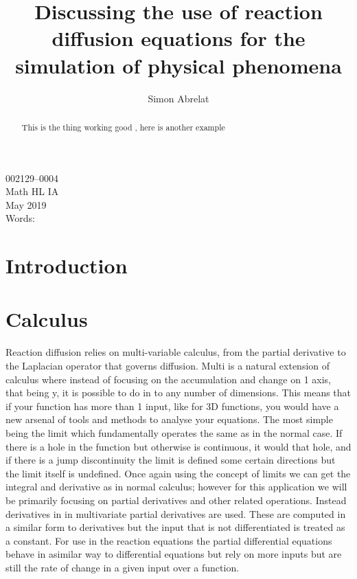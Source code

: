 \documentclass[12pt, letterpaper]{article}
\title{Discussing the use of reaction diffusion equations for the simulation of physical phenomena}
\author{Simon Abrelat}
\date{\vspace{-5ex}}
\begin{document}
\large
{\fontsize{12}{14.4}
  {\singlespace{}
  \maketitle
  \begin{center}
  \vspace{4mm}
  002129--0004 \\
  \vspace{4mm}
  Math HL IA \\
  \vspace{4mm}
  May 2019 \\
  \vspace{4mm}
  Words: \\
  \end{center}
  }
}
\newpage

\begin{abstract}
  This is the thing working good \citep{turing}, here is another example \citep*{grayscott}
\end{abstract}

\newpage
\tableofcontents
\newpage 

\section{Introduction}

\section{Calculus}
Reaction diffusion relies on multi-variable calculus, from the partial derivative to the Laplacian 
operator that governs diffusion. Multi is a natural extension of calculus where instead of 
focusing on the accumulation and change on 1 axis, that being y, it is possible to do in to any
number of dimensions. This means that if your function has more than 1 input, like for 3D functions, you would
have a new arsenal of tools and methods to analyse your equations. The most simple being the limit which
fundamentally operates the same as in the normal case. If there is a hole in the function but otherwise is
continuous, it would  that hole, and if there is a jump discontinuity the limit is defined some
certain directions but the limit itself is undefined. Once again using the concept of limits we can get the
integral and derivative as in normal calculus; however for this application we will be primarily focusing on
partial derivatives and other related operations. Instead derivatives in in multivariate partial derivatives are used. These are computed in a similar form to derivatives but the input that is not differentiated is
treated as a constant. For use in the reaction equations the partial differential equations behave in asimilar way to differential equations but rely on more inputs but are still the rate of change in a given 
input over a function.
\end{document}

